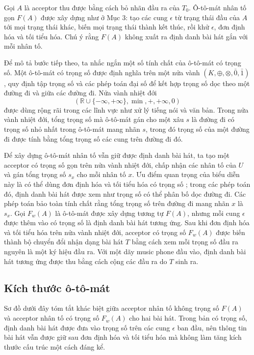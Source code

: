\documentclass[11pt]{article}
\newcommand{\eps}{\epsilon}
\begin{document}
Gọi $A$ là acceptor thu được bằng cách bỏ nhãn đầu ra của $T_0$. Ô-tô-mát nhân
tố gọn $F(A)$ được xây dựng như ở Mục 3: tạo các cung $\eps$ từ trạng thái đầu
của $A$ tới mọi trạng thái khác, biến mọi trạng thái thành kết thúc, rồi khử
$\eps$, đơn định hóa và tối tiểu hóa. Chú ý rằng $F(A)$ không xuất ra định
danh bài hát gắn với mỗi nhân tố.

Để mô tả bước tiếp theo, ta nhắc ngắn một số tính chất của ô-tô-mát có trọng
số. Một ô-tô-mát có trọng số được định nghĩa trên một nửa vành
$(K,\oplus,\otimes,\bar 0,\bar 1)$, quy định tập trọng số và các phép toán đại
số để kết hợp trọng số dọc theo một đường đi và giữa các đường đi. Nửa vành
nhiệt đới
\[
  (\mathbb R\cup\{-\infty,+\infty\},\min,+,+\infty,0)
\]
được dùng rộng rãi trong các lĩnh vực như xử lý tiếng nói và văn bản. Trong
nửa vành nhiệt đới, tổng trọng số mà ô-tô-mát gán cho một xâu $s$ là đường đi
có trọng số nhỏ nhất trong ô-tô-mát mang nhãn $s$, trong đó trọng số của một
đường đi được tính bằng tổng trọng số các cung trên đường đi đó.

Để xây dựng ô-tô-mát nhân tố vẫn giữ được định danh bài hát, ta tạo một
acceptor có trọng số gọn trên nửa vành nhiệt đới, chấp nhận các nhân tố của
$U$ và gán tổng trọng số $s_x$ cho mỗi nhân tố $x$. Ưu điểm quan trọng của biểu
diễn này là có thể dùng đơn định hóa và tối tiểu hóa có trọng số
\cite{mohri-transducers}; trong các phép toán đó, định danh bài hát được xem
như trọng số có thể phân bố dọc đường đi. Các phép toán bảo toàn tính chất rằng
tổng trọng số trên đường đi mang nhãn $x$ là $s_x$. Gọi $F_w(A)$ là ô-tô-mát
được xây dựng tương tự $F(A)$, nhưng mỗi cung $\eps$ được thêm vào có trọng số
là định danh bài hát tương ứng. Sau khi đơn định hóa và tối tiểu hóa trên nửa
vành nhiệt đới, acceptor có trọng số $F_w(A)$ được biến thành bộ chuyển đổi
nhận dạng bài hát $T$ bằng cách xem mỗi trọng số đầu ra nguyên là một ký hiệu
đầu ra. Với một dãy music phone đầu vào, định danh bài hát tương ứng được thu
bằng cách cộng các đầu ra do $T$ sinh ra.

\subsection{Kích thước ô-tô-mát}

Sơ đồ dưới đây tóm tắt khác biệt giữa acceptor nhân tố không trọng số $F(A)$
và acceptor nhân tố có trọng số $F_w(A)$ cho hai bài hát. Trong bản có trọng
số, định danh bài hát được đưa vào trọng số trên các cung $\eps$ ban đầu, nên
thông tin bài hát vẫn được giữ sau đơn định hóa và tối tiểu hóa mà không làm
tăng kích thước cấu trúc một cách đáng kể.
\end{document}
